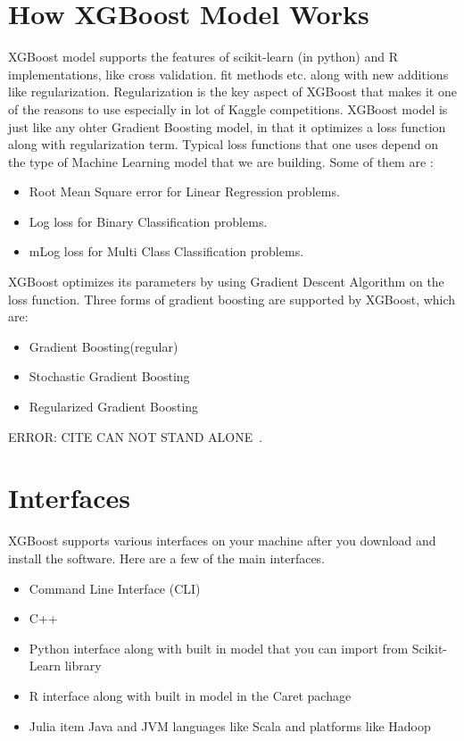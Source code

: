 \section{How XGBoost Model Works}

XGBoost model supports the features of scikit-learn (in python) and R
implementations, like cross validation. fit methods etc. along with new
additions like regularization.  Regularization is the key aspect of XGBoost that
makes it one of the reasons to use especially in  lot of Kaggle competitions.
XGBoost model is just like any ohter Gradient Boosting model, in that it
optimizes a loss function  along with regularization term. Typical loss
functions that one uses depend on the type of Machine Learning model that we are
building. Some of them are :

\begin{itemize}
\item Root Mean Square error for Linear Regression problems. 
\item Log loss for Binary Classification problems. 
\item mLog loss for Multi Class Classification problems.
\end{itemize}

XGBoost optimizes its parameters by using Gradient Descent Algorithm on the loss
function. Three forms of gradient boosting are supported by XGBoost, which are:

\begin{itemize}
\item Gradient Boosting(regular)
\item Stochastic Gradient Boosting
\item Regularized Gradient Boosting 
\end{itemize}

ERROR: CITE CAN NOT STAND ALONE~\cite{hid-sp18-401-XGBoost-MLmastery}.


\section{Interfaces}

XGBoost supports various interfaces on your machine after you download and
install the software. Here are a few of the main interfaces.

\begin{itemize}
\item Command Line Interface (CLI)  
\item C++  
\item Python interface along with built in model that you can import 
from Scikit-Learn library   
\item R interface along with built in model in the Caret pachage  
\item Julia item Java and JVM languages like Scala and platforms like Hadoop
\end{itemize}

